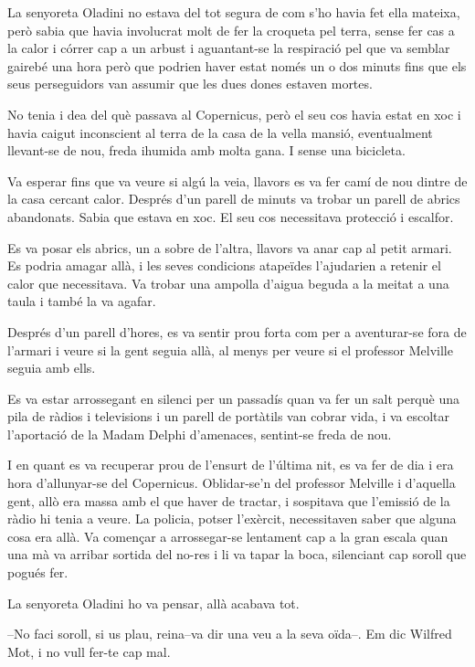 La senyoreta Oladini no estava del tot segura de com s'ho havia fet ella
mateixa, però sabia que havia involucrat molt de fer la croqueta pel
terra, sense fer cas a la calor i córrer cap a un arbust i aguantant-se
la respiració pel que va semblar gairebé una hora però que podrien haver
estat només un o dos minuts fins que els seus perseguidors van assumir
que les dues dones estaven mortes.

No tenia i dea del què passava al Copernicus, però el seu cos havia
estat en xoc i havia caigut inconscient al terra de la casa de la vella
mansió, eventualment llevant-se de nou, freda ihumida amb molta gana. I
sense una bicicleta.

Va esperar fins que va veure si algú la veia, llavors es va fer camí de
nou dintre de la casa cercant calor. Després d'un parell de minuts va
trobar un parell de abrics abandonats. Sabia que estava en xoc. El seu
cos necessitava protecció i escalfor.

Es va posar els abrics, un a sobre de l'altra, llavors va anar cap al
petit armari. Es podria amagar allà, i les seves condicions atapeïdes
l'ajudarien a retenir el calor que necessitava. Va trobar una ampolla
d'aigua beguda a la meitat a una taula i també la va agafar.

Després d'un parell d'hores, es va sentir prou forta com per a
aventurar-se fora de l'armari i veure si la gent seguia allà, al menys
per veure si el professor Melville seguia amb ells.

Es va estar arrossegant en silenci per un passadís quan va fer un salt
perquè una pila de ràdios i televisions i un parell de portàtils van
cobrar vida, i va escoltar l'aportació de la Madam Delphi d'amenaces,
sentint-se freda de nou.

I en quant es va recuperar prou de l'ensurt de l'última nit, es va fer
de dia i era hora d'allunyar-se del Copernicus. Oblidar-se'n del
professor Melville i d'aquella gent, allò era massa amb el que haver de
tractar, i sospitava que l'emissió de la ràdio hi tenia a veure. La
policia, potser l'exèrcit, necessitaven saber que alguna cosa era allà.
Va començar a arrossegar-se lentament cap a la gran escala quan una mà
va arribar sortida del no-res i li va tapar la boca, silenciant cap
soroll que pogués fer.

La senyoreta Oladini ho va pensar, allà acabava tot.

--No faci soroll, si us plau, reina--va dir una veu a la seva oïda--. Em
dic Wilfred Mot, i no vull fer-te cap mal.

